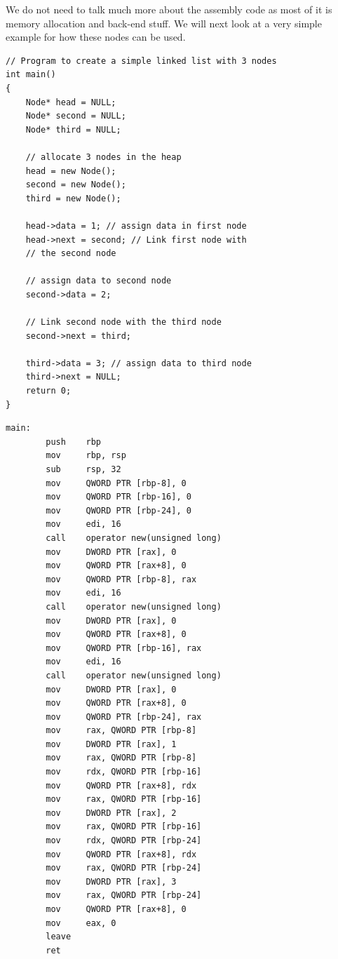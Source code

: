 \documentclass{article}
\theoremstyle{theorem}
\theoremstyle{definition}
\theoremstyle{remark}
\begin{document}
We do not need to talk much more about the assembly code as most of it is memory allocation and back-end stuff. We will next look at a very simple example for how these nodes can be used.

\begin{lstlisting}
// Program to create a simple linked list with 3 nodes
int main()
{
    Node* head = NULL;
    Node* second = NULL;
    Node* third = NULL;
  
    // allocate 3 nodes in the heap
    head = new Node();
    second = new Node();
    third = new Node();
  
    head->data = 1; // assign data in first node
    head->next = second; // Link first node with
    // the second node
  
    // assign data to second node
    second->data = 2;
  
    // Link second node with the third node
    second->next = third;
  
    third->data = 3; // assign data to third node
    third->next = NULL;
    return 0;
}
\end{lstlisting}

\begin{lstlisting}
main:
        push    rbp
        mov     rbp, rsp
        sub     rsp, 32
        mov     QWORD PTR [rbp-8], 0
        mov     QWORD PTR [rbp-16], 0
        mov     QWORD PTR [rbp-24], 0
        mov     edi, 16
        call    operator new(unsigned long)
        mov     DWORD PTR [rax], 0
        mov     QWORD PTR [rax+8], 0
        mov     QWORD PTR [rbp-8], rax
        mov     edi, 16
        call    operator new(unsigned long)
        mov     DWORD PTR [rax], 0
        mov     QWORD PTR [rax+8], 0
        mov     QWORD PTR [rbp-16], rax
        mov     edi, 16
        call    operator new(unsigned long)
        mov     DWORD PTR [rax], 0
        mov     QWORD PTR [rax+8], 0
        mov     QWORD PTR [rbp-24], rax
        mov     rax, QWORD PTR [rbp-8]
        mov     DWORD PTR [rax], 1
        mov     rax, QWORD PTR [rbp-8]
        mov     rdx, QWORD PTR [rbp-16]
        mov     QWORD PTR [rax+8], rdx
        mov     rax, QWORD PTR [rbp-16]
        mov     DWORD PTR [rax], 2
        mov     rax, QWORD PTR [rbp-16]
        mov     rdx, QWORD PTR [rbp-24]
        mov     QWORD PTR [rax+8], rdx
        mov     rax, QWORD PTR [rbp-24]
        mov     DWORD PTR [rax], 3
        mov     rax, QWORD PTR [rbp-24]
        mov     QWORD PTR [rax+8], 0
        mov     eax, 0
        leave
        ret
\end{lstlisting}
\end{document}
